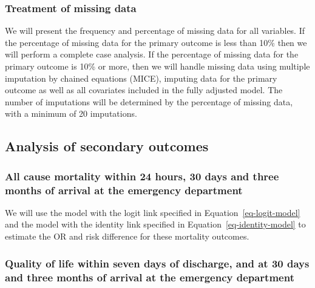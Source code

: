 \documentclass[
]{scrartcl}
\begin{document}
\hypertarget{treatment-of-missing-data}{%
\subsubsection{Treatment of missing
data}\label{treatment-of-missing-data}}

We will present the frequency and percentage of missing data for all
variables. If the percentage of missing data for the primary outcome is
less than 10\% then we will perform a complete case analysis. If the
percentage of missing data for the primary outcome is 10\% or more, then
we will handle missing data using multiple imputation by chained
equations (MICE), imputing data for the primary outcome as well as all
covariates included in the fully adjusted model. The number of
imputations will be determined by the percentage of missing data, with a
minimum of 20 imputations.

\hypertarget{analysis-of-secondary-outcomes}{%
\subsection{Analysis of secondary
outcomes}\label{analysis-of-secondary-outcomes}}

\hypertarget{all-cause-mortality-within-24-hours-30-days-and-three-months-of-arrival-at-the-emergency-department}{%
\subsubsection{All cause mortality within 24 hours, 30 days and three
months of arrival at the emergency
department}\label{all-cause-mortality-within-24-hours-30-days-and-three-months-of-arrival-at-the-emergency-department}}

We will use the model with the logit link specified in
Equation~\ref{eq-logit-model} and the model with the identity link
specified in Equation~\ref{eq-identity-model} to estimate the OR and
risk difference for these mortality outcomes.

\hypertarget{quality-of-life-within-seven-days-of-discharge-and-at-30-days-and-three-months-of-arrival-at-the-emergency-department}{%
\subsubsection{Quality of life within seven days of discharge, and at 30
days and three months of arrival at the emergency
department}\label{quality-of-life-within-seven-days-of-discharge-and-at-30-days-and-three-months-of-arrival-at-the-emergency-department}}
\end{document}
